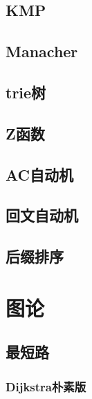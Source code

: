 \documentclass[10pt,a4paper]{article}
\begin{document}
\subsection{KMP}

\subsection{Manacher}

\subsection{trie树}

\subsection{Z函数}
\begin{spacing}{1.5}

\end{spacing}

\subsection{AC自动机}

\subsection{回文自动机}
\begin{spacing}{1.5}

\end{spacing}

\subsection{后缀排序}
\begin{spacing}{1.5}

\end{spacing}

\section{图论}
\subsection{最短路}
\subsubsection{Dijkstra朴素版}
\begin{spacing}{1.5}

\end{spacing}

\end{document}
